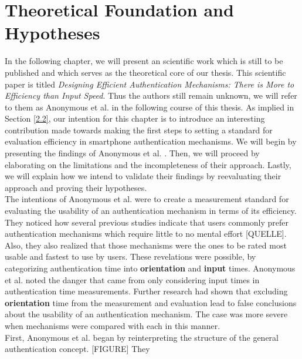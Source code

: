 
\chapter{Theoretical Foundation and Hypotheses}\label{ch:third}

In the following chapter, we will present an scientific work which is still to be published and which serves as the theoretical core of our thesis. This scientific paper is titled \textit{Designing Efficient Authentication Mechanisms: There is More to Efficiency than Input Speed}. Thus the authors still remain unknown, we will refer to them as Anonymous et al. \cite{anonymous} in the following course of this thesis. As implied in Section \ref{2.2}, our intention for this chapter is to introduce an interesting contribution made towards making the first steps to setting a standard for evaluation efficiency in smartphone authentication mechanisms. We will begin by presenting the findings of Anonymous et al. \cite{anonymous}. Then, we will proceed by elaborating on the limitations and the incompleteness of their approach. Lastly, we will explain how we intend to validate their findings by reevaluating their approach and proving their hypotheses.\\

The intentions of Anonymous et al. \cite{anonymous} were to create a measurement standard for evaluating the usability of an authentication mechanism in terms of its efficiency. They noticed how several previous studies indicate that users commonly prefer authentication mechanisms which require little to no mental effort [QUELLE]. Also, they also realized that those mechanisms were the ones to be rated most usable and fastest to use by users. These revelations were possible, by categorizing authentication time into \textbf{orientation} and \textbf{input} times. Anonymous et al. \cite{anonymous} noted the danger that came from only considering input times in authentication time measurements. Further research had shown that excluding \textbf{orientation} time from the measurement and evaluation lead to false conclusions about the usability of an authentication mechanism. The case was more severe when mechanisms were compared with each in this manner.  \\

First, Anonymous et al. \cite{anonymous} began by reinterpreting the structure of the general authentication concept. [FIGURE]
They 